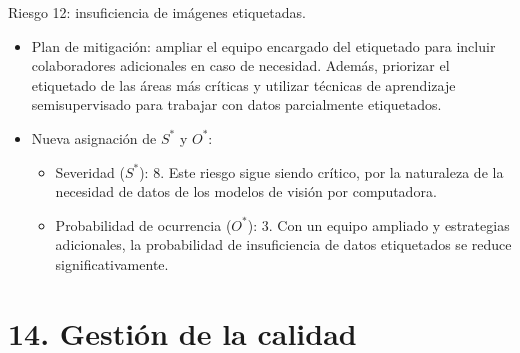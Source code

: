 \documentclass[
11pt, %
]{charter}
\begin{document}
Riesgo 12: insuficiencia de imágenes etiquetadas.
\begin{itemize}
  \item Plan de mitigación: ampliar el equipo encargado del etiquetado para incluir colaboradores adicionales en caso de necesidad. Además, priorizar el etiquetado de las áreas más críticas y utilizar técnicas de aprendizaje semisupervisado para trabajar con datos parcialmente etiquetados.
  \item Nueva asignación de $S^*$ y $O^*$:
        \begin{itemize}
          \item Severidad ($S^*$): 8. Este riesgo sigue siendo crítico, por la naturaleza de la necesidad de datos de los modelos de visión por computadora.
          \item Probabilidad de ocurrencia ($O^*$): 3. Con un equipo ampliado y estrategias adicionales, la probabilidad de insuficiencia de datos etiquetados se reduce significativamente.
        \end{itemize}
\end{itemize}

\section{14. Gestión de la calidad}
\label{sec:calidad}
\end{document}
